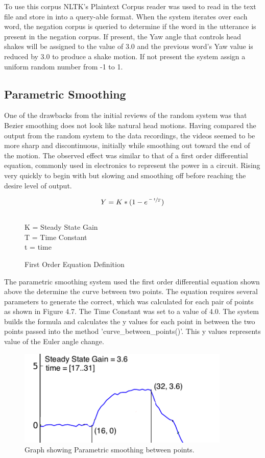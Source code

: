 \documentclass[bsc,frontabs,twoside,singlespacing,parskip]{infthesis}
\begin{document}
To use this corpus NLTK's Plaintext Corpus reader was used to read in the text file and store in into a query-able format. When the system iterates over each word, the negation corpus is queried to determine if the word in the utterance is present in the negation corpus. If present, the Yaw angle that controls head shakes will be assigned to the value of 3.0 and the previous word's Yaw value is reduced by 3.0 to produce a shake motion. If not present the system assign a uniform random number from -1 to 1.

\subsection{Parametric Smoothing}

One of the drawbacks from the initial reviews of the random system was that Bezier smoothing does not look like natural head motions. Having compared the output from the random system to the data recordings, the videos seemed to be more sharp and discontinuous, initially while smoothing out toward the end of the motion. The observed effect was similar to that of a first order differential equation, commonly used in electronics to represent the power in a circuit. Rising very quickly to begin with but slowing and smoothing off before reaching the desire level of output. 

\begin{figure}
	\centering
	$$ Y =  K * (1 - e^{\sfrac{-t}{T}})$$
	\\
	K = Steady State Gain\\
	T = Time Constant\\
	t = time\\
	
	\caption{First Order Equation Definition} 
\end{figure}

The parametric smoothing system used the first order differential equation shown above the determine the curve between two points. The equation requires several parameters to generate the correct, which was calculated for each pair of points as shown in Figure 4.7. The Time Constant was set to a value of 4.0. The system builds the formula and calculates the y values for each point in between the two points passed into the method 'curve\_between\_points()'. This y values represents value of the Euler angle change.

\begin{figure}
	\includegraphics[width=0.9\textwidth]{parametric_ex.png}
	\caption{Graph showing Parametric smoothing between points.}
\end{figure}
\end{document}
